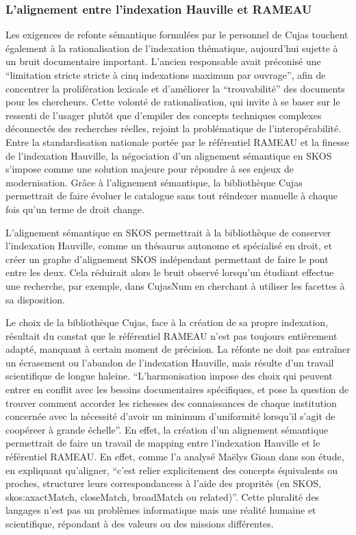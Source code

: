 \subsubsection{L'alignement entre l'indexation Hauville et RAMEAU}
Les exigences de refonte sémantique formulées par le personnel de Cujas touchent également à la rationalisation de l'indexation thématique, aujourd'hui sujette à un bruit documentaire important. L'ancien responsable avait préconisé une \enquote{limitation stricte stricte à cinq indexations maximum par ouvrage}, afin de concentrer la prolifération lexicale et d'améliorer la \enquote{trouvabilité} des documents pour les chercheurs. Cette volonté de rationalisation, qui invite à se baser sur le ressenti de l'usager plutôt que d'empiler des concepts techniques complexes déconnectés des recherches réelles, rejoint la problématique de l'interopérabilité. Entre la standardisation nationale portée par le référentiel RAMEAU et la finesse de l'indexation Hauville, la négociation d'un alignement sémantique en SKOS s'impose comme une solution majeure pour répondre à ses enjeux de modernisation. Grâce à l'alignement sémantique, la bibliothèque Cujas permettrait de faire évoluer le catalogue sans tout réindexer manuelle à chaque fois qu'un terme de droit change. 

L'alignement sémantique en SKOS permettrait à la bibliothèque de conserver l'indexation Hauville, comme un thésaurus autonome et spécialisé en droit, et créer un graphe d'alignement SKOS indépendant permettant de faire le pont entre les deux. Cela réduirait alors le bruit observé lorsqu'un étudiant effectue une recherche, par exemple, dans CujasNum en cherchant à utiliser les facettes à sa disposition. 

Le choix de la bibliothèque Cujas, face à la création de sa propre indexation, résultait du constat que le référentiel RAMEAU n'est pas toujours entièrement adapté, manquant à certain moment de précision. La réfonte ne doit pas entraîner un écrasement ou l'abandon de l'indexation Hauville, mais résulte d'un travail scientifique de longue haleine. \enquote{L'harmonisation impose des choix qui peuvent entrer en conflit avec les besoins documentaires spécifiques, et pose la question de trouver comment accorder les richesses des connaissances de chaque institution concernée avec la nécessité d'avoir un minimum d'uniformité lorsqu'il s'agit de coopéreer à grande échelle}. En effet, la création d'un alignement sémantique permettrait de faire un travail de mapping entre l'indexation Hauville et le référentiel RAMEAU. En effet, comme l'a analysé Maëlys Gioan dans son étude, en expliquant qu'aligner, \enquote{c'est relier explicitement des concepts équivalents ou proches, structurer leurs correspondancess à l'aide des proprités (en SKOS, skos:axactMatch, closeMatch, broadMatch ou related)}. Cette pluralité des langages n'est pas un problèmes informatique mais une réalité humaine et scientifique, répondant à des valeurs ou des missions différentes.

